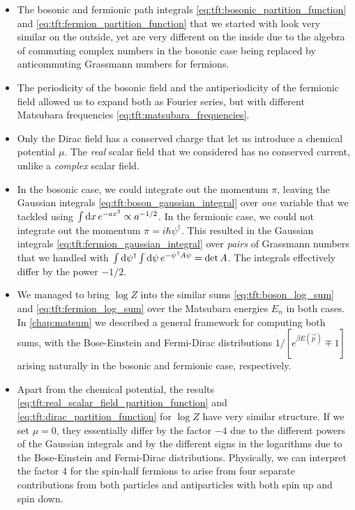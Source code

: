 \begin{itemize}
\item The bosonic and fermionic path integrals \eqref{eq:tft:bosonic_partition_function} and \eqref{eq:tft:fermion_partition_function} that we started with look very similar on the outside, yet are very different on the inside due to the algebra of commuting complex numbers in the bosonic case being replaced by anticommuting Grassmann numbers for fermions.
\item The periodicity of the bosonic field and the antiperiodicity of the fermionic field allowed us to expand both as Fourier series, but with different Matsubara frequencies \eqref{eq:tft:matsubara_frequencies}.
\item Only the Dirac field has a conserved charge that let us introduce a chemical potential $\mu$.
      The \emph{real} scalar field that we considered has no conserved current, unlike a \emph{complex} scalar field.
\item In the bosonic case, we could integrate out the momentum $\pi$, leaving the Gaussian integrals \eqref{eq:tft:boson_gaussian_integral} over \emph{one} variable that we tackled using $\int \mathop{}\!\mathrm{d} x \, e^{-ax^2} \propto a^{-1/2}$.
      In the fermionic case, we could not integrate out the momentum $\pi = i \hbar \psi^\dagger$.
      This resulted in the Gaussian integrals \eqref{eq:tft:fermion_gaussian_integral} over \emph{pairs} of Grassmann numbers that we handled with $\int \mathop{}\!\mathrm{d} \psi^\dagger \int \mathop{}\!\mathrm{d} \psi \, e^{-\psi^\dagger A \psi} = \operatorname{det} A$.
	  The integrals effectively differ by the power $-1/2$.
\item We managed to bring $\log Z$ into the similar sums \eqref{eq:tft:boson_log_sum} and \eqref{eq:tft:fermion_log_sum} over the Matsubara energies $E_n$ in both cases.
      In \cref{chap:matsum} we described a general framework for computing both sums, with the Bose-Einstein and Fermi-Dirac distributions $1 / [e^{\beta E(\vec{p})} \mp 1]$ arising naturally in the bosonic and fermionic case, respectively.
\item Apart from the chemical potential, the results \eqref{eq:tft:real_scalar_field_partition_function} and \eqref{eq:tft:dirac_partition_function} for $\log Z$ have very similar structure.
      If we set $\mu = 0$, they essentially differ by the factor $-4$ due to the different powers of the Gaussian integrals and by the different signs in the logarithms due to the Bose-Einstein and Fermi-Dirac distributions.
      Physically, we can interpret the factor $4$ for the spin-half fermions to arise from four separate contributions from both particles and antiparticles with both spin up and spin down.
\end{itemize}



